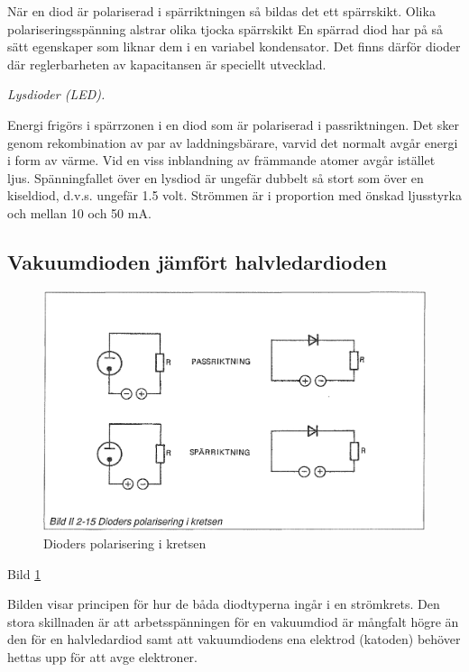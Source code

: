   När en diod är polariserad i spärriktningen så bildas det ett spärrskikt.
  Olika polariseringsspänning alstrar olika tjocka spärrskikt En spärrad diod
  har på så sätt egenskaper som liknar dem i en variabel kondensator. Det finns
  därför dioder där reglerbarheten av kapacitansen är speciellt utvecklad.

\emph{Lysdioder (LED).}

  Energi frigörs i spärrzonen i en diod som är polariserad i passriktningen. Det
  sker genom rekombination av par av laddningsbärare, varvid det normalt avgår
  energi i form av värme. Vid en viss inblandning av främmande atomer avgår
  istället ljus. Spänningfallet över en lysdiod är ungefär dubbelt så stort som
  över en kiseldiod, d.v.s. ungefär 1.5 volt. Strömmen är i proportion med
  önskad ljusstyrka och mellan 10 och 50 mA.


\subsection{Vakuumdioden jämfört halvledardioden}

\begin{figure}[h]
\begin{center}
\includegraphics[width=14cm]{images/bild_2_2-15}
\caption{Dioders polarisering i kretsen}
\label{fig:BildII2-15}
\end{center}
\end{figure}

Bild \ref{fig:BildII2-15}

Bilden visar principen för hur de båda diodtyperna ingår i en strömkrets. Den
stora skillnaden är att arbetsspänningen för en vakuumdiod är mångfalt högre än
den för en halvledardiod samt att vakuumdiodens ena elektrod (katoden) behöver
hettas upp för att avge elektroner.
